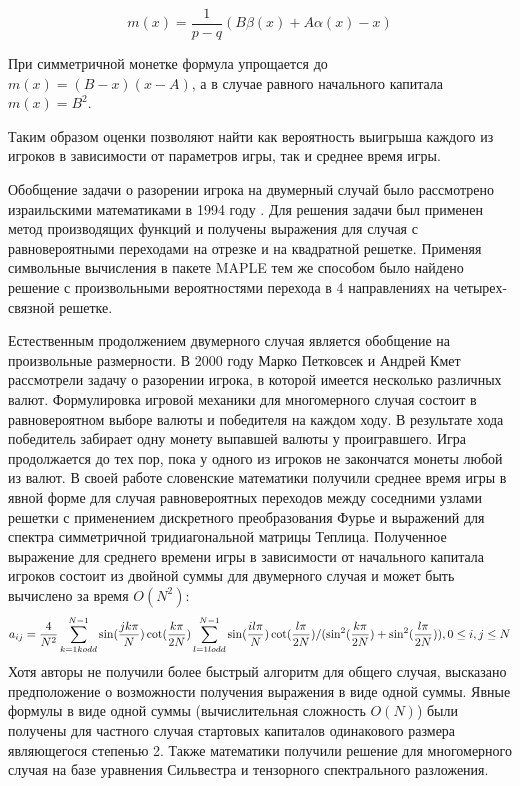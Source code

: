 \begin{equation}
    \label{eq:eq6}
    m(x) = \frac{1}{p - q} (B \beta(x) + A \alpha(x) - x)
\end{equation}

При симметричной монетке формула упрощается до $m(x) = (B - x) (x - A)$, а в случае равного начального капитала $m(x) = B^2$.

Таким образом оценки позволяют найти как вероятность выигрыша каждого из игроков в зависимости от параметров игры, так и среднее время игры.

Обобщение задачи о разорении игрока на двумерный случай было рассмотрено израильскими математиками в 1994 году \cite{orr_computer_1994}. 
Для решения задачи был применен метод производящих функций и получены выражения для случая с равновероятными переходами на отрезке и на квадратной решетке.
Применяя символьные вычисления в пакете MAPLE \cite{monagan2012maple} тем же способом было найдено решение с произвольными вероятностями перехода в 4 направлениях 
на четырех-связной решетке. 

Естественным продолжением двумерного случая является обобщение на произвольные размерности. В 2000 году Марко Петковсек и Андрей Кмет 
рассмотрели задачу о разорении игрока, в которой имеется несколько различных валют. \cite{kmet_gamblers_2002}
Формулировка игровой механики для многомерного случая состоит в равновероятном выборе валюты и победителя на каждом ходу.
В результате хода победитель забирает одну монету выпавшей валюты у проигравшего. Игра продолжается до тех пор, пока у одного из игроков не закончатся монеты любой из валют.
В своей работе словенские математики получили среднее время игры в явной форме для случая равновероятных переходов между соседними узлами решетки
с применением дискретного преобразования Фурье и выражений для спектра симметричной тридиагональной матрицы Теплица.
Полученное выражение для среднего времени игры в зависимости от начального капитала игроков состоит из двойной суммы для двумерного случая 
и может быть вычислено за время $O(N^2)$: 
\begin{equation}
    \label{eq:eq7}
    a_{ij} = \frac{4}{N^2} \sum_{k=1\\ k odd}^{N - 1} \sin(\frac{jk\pi}{N})\cot(\frac{k\pi}{2N}) \\
    \sum_{l=1\\ l odd}^{N - 1} \sin(\frac{il\pi}{N})\cot(\frac{l\pi}{2N})/(\sin^2(\frac{k\pi}{2N})+\sin^2(\frac{l\pi}{2N})), \\
    0 \leq i, j \leq N
\end{equation}
Хотя авторы не получили более быстрый алгоритм для общего случая, высказано предположение о возможности получения выражения в виде одной суммы.
Явные формулы в виде одной суммы (вычислительная сложность $O(N)$) были получены для частного случая стартовых капиталов одинакового размера являющегося степенью 2.
Также математики получили решение для многомерного случая на базе уравнения Сильвестра и тензорного спектрального разложения.


